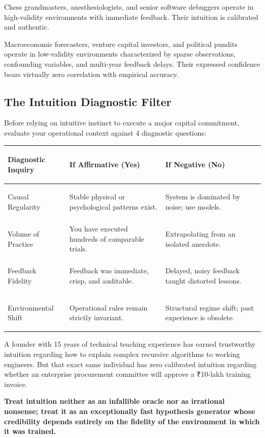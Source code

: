 Chess grandmasters, anesthesiologists, and senior software debuggers operate in high-validity environments with immediate feedback. Their intuition is calibrated and authentic.

Macroeconomic forecasters, venture capital investors, and political pundits operate in low-validity environments characterized by sparse observations, confounding variables, and multi-year feedback delays. Their expressed confidence bears virtually zero correlation with empirical accuracy.

\subsection{The Intuition Diagnostic Filter}

Before relying on intuitive instinct to execute a major capital commitment, evaluate your operational context against 4 diagnostic questions:

\begin{tcolorbox}[
  enhanced,
  colback=BayesSurface!60,
  colframe=BayesBorder,
  boxrule=0.5pt,
  arc=3pt,
  left=3pt,right=3pt,top=3pt,bottom=3pt,
  boxsep=1pt
]
\scriptsize
\begin{tabularx}{\linewidth}{>{\bfseries\raggedright\arraybackslash}p{2.3cm} X X}
\toprule
\textbf{Diagnostic Inquiry} & \textbf{If Affirmative (Yes)} & \textbf{If Negative (No)} \\
\midrule
Causal Regularity & Stable physical or psychological patterns exist. & System is dominated by noise; use models. \\
\addlinespace[2pt]
Volume of Practice & You have executed hundreds of comparable trials. & Extrapolating from an isolated anecdote. \\
\addlinespace[2pt]
Feedback Fidelity & Feedback was immediate, crisp, and auditable. & Delayed, noisy feedback taught distorted lessons. \\
\addlinespace[2pt]
Environmental Shift & Operational rules remain strictly invariant. & Structural regime shift; past experience is obsolete. \\
\bottomrule
\end{tabularx}
\end{tcolorbox}

A founder with 15 years of technical teaching experience has earned trustworthy intuition regarding how to explain complex recursive algorithms to working engineers. But that exact same individual has zero calibrated intuition regarding whether an enterprise procurement committee will approve a ₹10-lakh training invoice.

\textbf{Treat intuition neither as an infallible oracle nor as irrational nonsense; treat it as an exceptionally fast hypothesis generator whose credibility depends entirely on the fidelity of the environment in which it was trained.}
